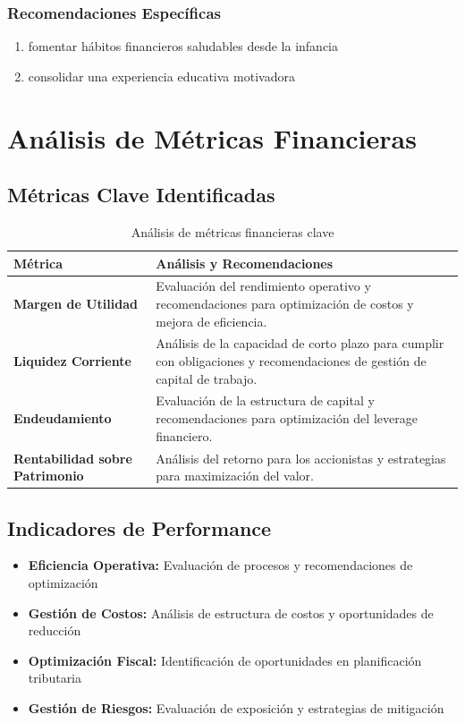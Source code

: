 \documentclass[11pt]{report}
\begin{document}
\subsection{Recomendaciones Específicas}
\begin{enumerate}
    \item fomentar hábitos financieros saludables desde la infancia
    \item consolidar una experiencia educativa motivadora
\end{enumerate}


\chapter{Análisis de Métricas Financieras}

\section{Métricas Clave Identificadas}
\begin{table}[H]
    \centering
    \begin{tabular}{p{}p{}}
        \toprule
        \textbf{Métrica} & \textbf{Análisis y Recomendaciones} \\
        \midrule
        \textbf{Margen de Utilidad} & 
        Evaluación del rendimiento operativo y recomendaciones para optimización 
        de costos y mejora de eficiencia. \\
        \hline
        \textbf{Liquidez Corriente} & 
        Análisis de la capacidad de corto plazo para cumplir con obligaciones 
        y recomendaciones de gestión de capital de trabajo. \\
        \hline
        \textbf{Endeudamiento} & 
        Evaluación de la estructura de capital y recomendaciones para 
        optimización del leverage financiero. \\
        \hline
        \textbf{Rentabilidad sobre Patrimonio} & 
        Análisis del retorno para los accionistas y estrategias para 
        maximización del valor. \\
        \bottomrule
    \end{tabular}
    \caption{Análisis de métricas financieras clave}
\end{table}

\section{Indicadores de Performance}
\begin{itemize}
    \item \textbf{Eficiencia Operativa:} Evaluación de procesos y recomendaciones de optimización
    \item \textbf{Gestión de Costos:} Análisis de estructura de costos y oportunidades de reducción
    \item \textbf{Optimización Fiscal:} Identificación de oportunidades en planificación tributaria
    \item \textbf{Gestión de Riesgos:} Evaluación de exposición y estrategias de mitigación
\end{itemize}
\end{document}
